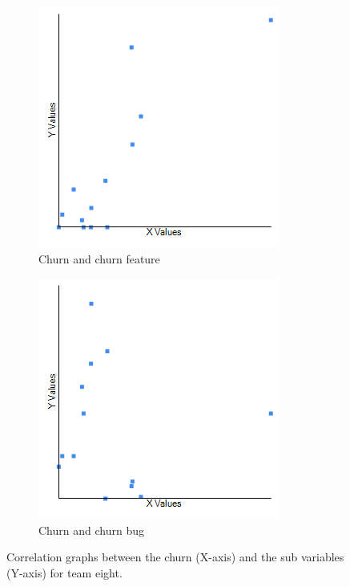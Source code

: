 \documentclass[UKenglish]{ifimaster}  %
\begin{document}
\begin{minipage}[t]{\linewidth}
\begin{figure}[H] 
  \begin{subfigure}[b]{0.5\textwidth}
  \center
\includegraphics[scale=0.6]{Picture/Eight/ChurnVSChurnFT.png}
 \caption{Churn and churn feature} 
 \label{fig:a:lt:8}
  \end{subfigure}
  \begin{subfigure}[b]{0.5\textwidth}
    \center
\includegraphics[scale=0.6]{Picture/Eight/ChurnVSChurnB.png}
 \caption{Churn and churn bug} 
\label{fig:b:lt:8}
  \end{subfigure}
\caption{Correlation graphs between the churn (X-axis)  and the sub variables (Y-axis) for team eight.}
\label{corr:Difference:lt:8}
\end{figure}
\end{minipage}
\end{document}
